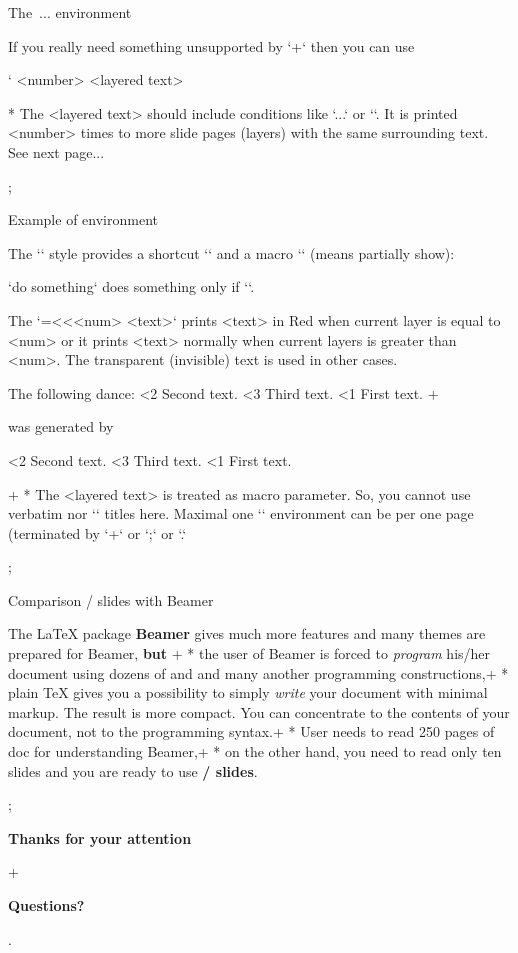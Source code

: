 \sec The \code{\\layers}\,...\code{\\endlayers} environment

If you really need something unsupported by `\pg+` then you can use 

\begtt \catcode`
\layers <number>
<layered text>
\endlayers
\endtt 

* The <layered text> should include conditions like
  `\ifnum\layernum...` or `\ifcase\layernum`. 
  It is printed <number> times to more slide pages (layers) with the same
  surrounding text. See next page... 

\pg; %

\sec Example of \code{\\layers} environment

The `\slides` style provides a shortcut `\use` and a macro `\pshow` (means
partially show):

\begtt
\def\use#1#2{\ifnum\layernum#1\relax#2\fi}
\def\pshow#1{\use{=#1}\Red \use{<#1}\Transparent \ignorespaces}
\endtt
`\use{=3}{do something}` does something only if ``.

The `{\pshow<num> <text>}` prints <text> in Red when current layer is equal
to <num> or it prints <text> normally when current layers is greater than <num>.
The transparent (invisible) text is used in other cases.

The following dance:
{\pshow2 Second text.} {\pshow3 Third text.} {\pshow1 First text.} 
\endlayers
\pg+

was generated by

\begtt
{}
{\pshow2 Second text.} {\pshow3 Third text.} {\pshow1 First text.} 
\endlayers
\endtt

\pg+
* The <layered text> is treated as macro parameter. So, you cannot use verbatim
  nor `\sec` titles here. Maximal one `\layers` environment can be per one 
  page (terminated by `\pg+` or `\pg;` or `\pg.`

\pg; %

\sec Comparison \OpTeX/ slides with Beamer

The \LaTeX{} package {\bf\Blue Beamer} gives much more features and many themes
are prepared for Beamer, {\bf\Red but}
\pg+
* the user of Beamer is forced to {\em program} his/her document using 
  dozens of \code{\\begin{foo}} and \code{\\end{foo}} and many another
  programming constructions,\pg+
* plain \TeX{} gives you a possibility to simply 
  {\em write} your document with minimal markup. The result is more compact.
  You can concentrate to the contents of your document, not to the
  programming syntax.\pg+
* User needs to read 250 pages of doc for understanding Beamer,\pg+
* on the other hand, you need to read only ten 
  slides
  and you are ready to use {\bf\Blue\OpTeX/ slides}.

\pg; %

\null
\vskip2cm
\centerline{\typosize[35/40]\bf Thanks for your attention}\pg+

\vskip2cm
\centerline{\Blue\typosize[60/70]\bf Questions?}

\pg. %

